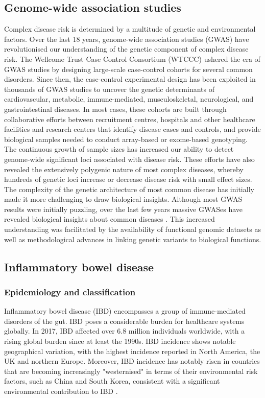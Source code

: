 \subsection{Genome-wide association studies}
Complex disease risk is determined by a multitude of genetic and environmental factors. Over the last 18 years, genome-wide association studies (GWAS) have revolutionised our understanding of the genetic component of complex disease risk. The Wellcome Trust Case Control Consortium (WTCCC) ushered the era of GWAS studies by designing large-scale case-control cohorts for several common disorders. Since then, the case-control experimental design has been exploited in thousands of GWAS studies to uncover the genetic determinants of cardiovascular, metabolic, immune-mediated, musculoskeletal, neurological, and gastrointestinal diseases. In most cases, these cohorts are built through collaborative efforts between recruitment centres, hospitals and other healthcare facilities and research centers that identify disease cases and controls, and provide biological samples needed to conduct array-based or exome-based genotyping. The continuous growth of sample sizes has increased our ability to detect genome-wide significant loci associated with disease risk. These efforts have also revealed the extensively polygenic nature of most complex diseases, whereby hundreds of genetic loci increase or decrease disease risk with small effect sizes. The complexity of the genetic architecture of most common disease has initially made it more challenging to draw biological insights. Although most GWAS results were initially puzzling, over the last few years massive GWASes have revealed biological insights about common diseases \cite{Xue2018-ni,Aragam2022-ep}. This increased understanding was facilitated by the availability of functional genomic datasets as well as methodological advances in linking genetic variants to biological functions. 

\subsection{Inflammatory bowel disease}
\subsubsection{Epidemiology and classification}
Inflammatory bowel disease (IBD) encompasses a group of immune-mediated disorders of the gut. IBD poses a considerable burden for healthcare systems globally. In 2017, IBD affected over 6.8 million individuals worldwide, with a rising global burden since at least the 1990s. IBD incidence shows notable geographical variation, with the highest incidence reported in North America, the UK and northern Europe. Moreover, IBD incidence has notably risen in countries that are becoming increasingly "westernised" in terms of their environmental risk factors, such as China and South Korea, consistent with a significant environmental contribution to IBD \cite{Ng2013-of}.\\

